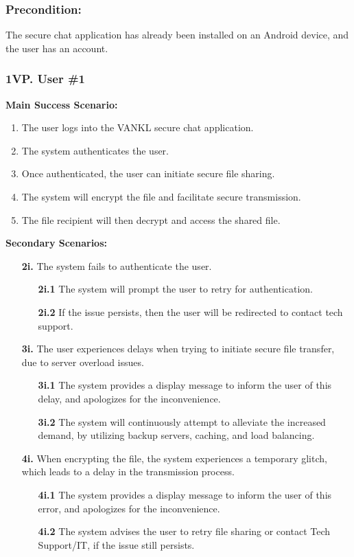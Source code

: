 \documentclass[]{article}
\begin{document}
\subsubsection*{Precondition:} The secure chat application has already been installed on an Android device, and the user has an account.
\subsubsection*{1VP. User \#1}
\textbf{Main Success Scenario:}
\begin{enumerate}
	\item The user logs into the VANKL secure chat application.
	\item The system authenticates the user.
	\item Once authenticated, the user can initiate secure file sharing.
	\item The system will encrypt the file and facilitate secure transmission.
	\item The file recipient will then decrypt and access the shared file.
\end{enumerate}
\textbf{Secondary Scenarios:}
\begin{enumerate}
	\item[\textbf{2i.}] The system fails to authenticate the user.
		\begin{enumerate}
			\item[\textbf{2i.1}] The system will prompt the user to retry for authentication.
			\item[\textbf{2i.2}] If the issue persists, then the user will be redirected to contact tech support.
		\end{enumerate}
	\item[\textbf{3i.}] The user experiences delays when trying to initiate secure file transfer, due to server overload issues.
		\begin{enumerate}
			\item[\textbf{3i.1}] The system provides a display message to inform the user of this delay, and apologizes for the inconvenience.
			\item[\textbf{3i.2}] The system will continuously attempt to alleviate the increased demand, by utilizing backup servers, caching, and load balancing.
		\end{enumerate}
	\item[\textbf{4i.}] When encrypting the file, the system experiences a temporary glitch, which leads to a delay in the transmission process.
		\begin{enumerate}
			\item[\textbf{4i.1}] The system provides a display message to inform the user of this error, and apologizes for the inconvenience.
			\item[\textbf{4i.2}] The system advises the user to retry file sharing or contact Tech Support/IT, if the issue still persists.
		\end{enumerate}
\end{enumerate}
\end{document}
